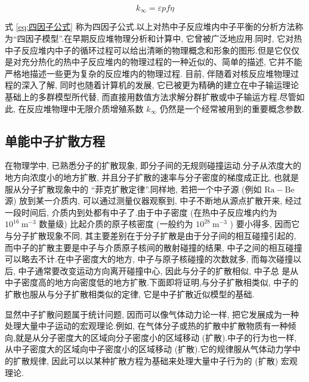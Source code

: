 \documentclass{Sichuan Normal University}
\begin{document}
\begin{equation}
k_{\infty}=\varepsilon p f \eta
\label{eq:四因子公式}
\end{equation}

式 \eqref{eq:四因子公式} 称为四因子公式.以上对热中子反应堆内中子平衡的分析方法称为“四因子模型”.在早期反应堆物理分析和计算中, 它曾被广泛地应用.同时, 它对热中子反应堆内中子的循环过程可以给出清晰的物理概念和形象的图形.但是它仅仅是对充分热化的热中子反应堆内的物理过程的一种近似的、简单的描述, 它并不能严格地描述一些更为复杂的反应堆内的物理过程.
目前, 伴随着对核反应堆物理过程的深入了解, 同时也随着计算机的发展, 它已被更为精确的建立在中子输运理论基础上的多群模型所代替, 而直接用数值方法求解分群扩散或中子输运方程.尽管如此, 在反应堆物理中无限介质增殖系数 $k_{\infty}$ 仍然是一个经常被用到的重要概念参数.
  

\subsection{单能中子扩散方程}
在物理学中, 已熟悉分子的扩散现象, 即分子间的无规则碰撞运动.分子从浓度大的地方向浓度小的地方扩散, 并且分子扩散的速率与分子密度的梯度成正比, 也就是服从分子扩散现象中的 “菲克扩散定律”.同样地, 若把一个中子源 (例如 $\mathrm{Ra}-\mathrm{Be}$ 源) 放到某一介质内, 可以通过测量仪器观察到, 中子不断地从源点扩散开来, 经过一段时间后, 介质内到处都有中子了.由于中子密度 (在热中子反应堆内约为 $10^{16} \mathrm{~m}^{-3}$ 数量级) 比起介质的原子核密度 (一般约为 $10^{28} \mathrm{~m}^{-3}$ ) 要小得多, 因而它与分子扩散现象不同, 其主要差别在于分子扩散是由于分子间的相互碰撞引起的, 而中子的扩散主要是中子与介质原子核间的散射碰撞的结果, 中子之间的相互碰撞可以略去不计.在中子密度大的地方, 中子与原子核碰撞的次数就多, 而每次碰撞以后, 中子通常要改变运动方向离开碰撞中心, 因此与分子的扩散相似, 中子总
是从中子密度高的地方向密度低的地方扩散.下面即将证明,与分子扩散相类似, 中子的扩散也服从与分子扩散相类似的定律, 它是中子扩散近似模型的基础.

显然中子扩散问题属于统计问题, 因而可以像气体动力论一样, 把它发展成为一种处理大量中子运动的宏观理论.例如, 在气体分子或热的扩散中扩散物质有一种倾向,就是从分子密度大的区域向分子密度小的区域移动 (扩散).中子的行为也一样, 从中子密度大的区域向中子密度小的区域移动 (扩散).它的规律服从气体动力学中的扩散规律, 因此可以以某种扩散方程为基础来处理大量中子行为的 (扩散) 宏观理论.
\end{document}
